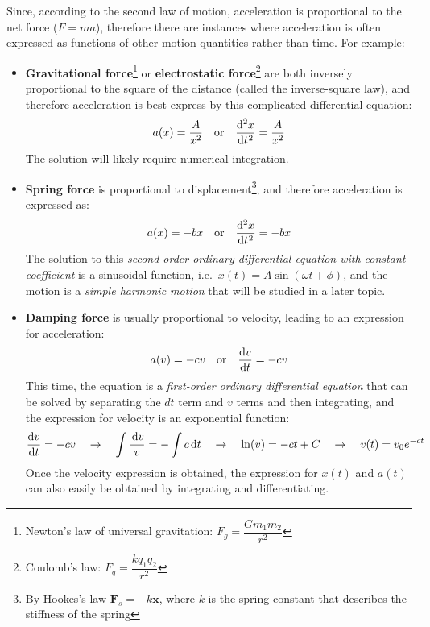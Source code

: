 \documentclass{../../oss-handout}
\begin{document}
Since, according to the second law of motion, acceleration is proportional to
the net force ($F=ma$), therefore there are instances where acceleration is
often expressed as functions of other motion quantities rather than time. For
example:
\begin{itemize}[leftmargin=15pt]
\item\textbf{Gravitational force}\footnote{Newton's law of universal
  gravitation: $F_g=\dfrac{Gm_1m_2}{r^2}$} or
  \textbf{electrostatic force}\footnote{Coulomb's law:
    $F_q=\dfrac{kq_1q_2}{r^2}$} are both inversely proportional to
  the square of the distance (called the inverse-square law), and therefore
  acceleration is best express by this complicated differential equation:
  \begin{equation*}
    a(x)=\frac A{x^2} \quad\text{or}\quad \diff[2] xt=\frac A{x^2}
  \end{equation*}
  The solution will likely require numerical integration.

\item\textbf{Spring force} is proportional to displacement\footnote{By Hookes's
  law $\bm F_s=-k\bm x$, where $k$ is the spring constant that describes the
  stiffness of the spring}, and therefore acceleration is expressed as:
  \begin{equation*}
    a(x)=-bx\quad\text{or}\quad \diff[2] xt=-bx
  \end{equation*}
  The solution to this \emph{second-order ordinary differential equation with
    constant coefficient} is a sinusoidal function, i.e.\
  $x(t)=A\sin(\omega t+\phi)$, and the motion is a \emph{simple harmonic
    motion} that will be studied in a later topic.

\item\textbf{Damping force}  is usually proportional to velocity, leading
  to an expression for acceleration:
  \begin{equation*}
    a(v)=-cv\quad\text{or}\quad \diff vt=-cv
  \end{equation*}
  This time, the equation is a \emph{first-order ordinary differential equation}
  that can be solved by separating the $dt$ term and $v$ terms and then
  integrating, and the expression for velocity is an exponential function:
  \begin{equation*}
    \diff vt=-cv\quad\rightarrow\quad \int\frac{\dl v}{v}=-\int c\dl t
    \quad\rightarrow\quad \ln(v)=-ct+C
    \quad\rightarrow\quad v(t)=v_0e^{-ct}
  \end{equation*}
  Once the velocity expression is obtained, the expression for $x(t)$ and
  $a(t)$ can also easily be obtained by integrating and differentiating.


\end{itemize}
\end{document}
